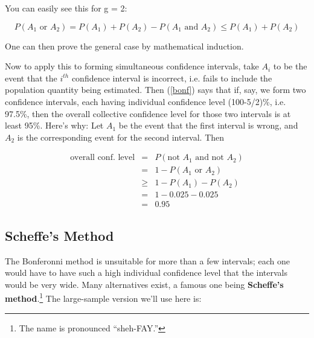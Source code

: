 You can easily see this for g = 2: 

\begin{equation}
P(A_1 \textrm{ or } A_2) = P(A_1) + P(A_2) - P(A_1 \textrm{ and } A_2)
\leq  P(A_1) + P(A_2)
\end{equation}

One can then prove the general case by mathematical induction.

Now to apply this to forming simultaneous confidence intervals, take
$A_i$ to be the event that the $i^{th}$ confidence interval is
incorrect, i.e. fails to include the population quantity being
estimated.  Then (\ref{bonf}) says that if, say, we form two confidence
intervals, each having individual confidence level (100-5/2)\%, i.e.
97.5\%, then the overall collective confidence level for those two
intervals is at least 95\%.  Here's why:
Let $A_1$ be the event that the first interval is wrong, and $A_2$ is
the corresponding event for the second interval.  Then

\begin{eqnarray}
\textrm{overall conf. level} &=& P(\textrm{not } A_1 \textrm{ and not } A_2) \\ 
&=& 1 - P(A_1 \textrm{ or } A_2) \\
&\geq&  1 - P(A_1) - P(A_2) \\
&=& 1 - 0.025 - 0.025 \\
&=& 0.95
\end{eqnarray}

\subsection{Scheffe's Method}
\label{scheffe}

The Bonferonni method is unsuitable for more than a few intervals; each
one would have to have such a high individual confidence level that the
intervals would be very wide.  Many alternatives exist, a famous one
being {\bf Scheffe's method}.\footnote{The name is pronounced
``sheh-FAY.''}  The large-sample version we'll use here is:

